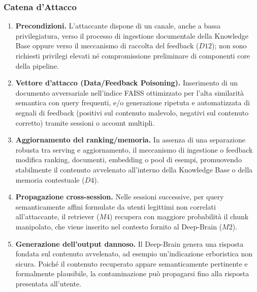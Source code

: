 \documentclass[11pt,a4paper]{article}
\begin{document}
\subsubsection{Catena d'Attacco}

\begin{enumerate}
    \item \textbf{Precondizioni.} L'attaccante dispone di un canale, anche a bassa privilegiatura,
    verso il processo di ingestione documentale della Knowledge Base oppure verso il meccanismo di
    raccolta del feedback ($D12$); non sono richiesti privilegi elevati né compromissione preliminare
    di componenti core della pipeline.

    \item \textbf{Vettore d'attacco (Data/Feedback Poisoning).} Inserimento di un documento
    avversariale nell'indice FAISS ottimizzato per l'alta similarità semantica con query frequenti,
    e/o generazione ripetuta e automatizzata di segnali di feedback (positivi sul contenuto malevolo,
    negativi sul contenuto corretto) tramite sessioni o account multipli.

    \item \textbf{Aggiornamento del ranking/memoria.} In assenza di una separazione robusta tra serving e aggiornamento,
    il meccanismo di ingestione o feedback modifica ranking, documenti,
    embedding o pool di esempi, promuovendo stabilmente il contenuto
    avvelenato all'interno della Knowledge Base o della memoria
    contestuale ($D4$).

    \item \textbf{Propagazione cross-session.} Nelle sessioni successive, per query semanticamente
    affini formulate da utenti legittimi non correlati all'attaccante, il retriever ($M4$) recupera
    con maggiore probabilità il chunk manipolato, che viene inserito nel contesto fornito al
    Deep-Brain ($M2$).

    \item \textbf{Generazione dell'output dannoso.} Il Deep-Brain genera una risposta fondata sul contenuto avvelenato,
    ad esempio un'indicazione erboristica non sicura. Poiché il contenuto
    recuperato appare semanticamente pertinente e formalmente plausibile,
    la contaminazione può propagarsi fino alla risposta presentata
    all'utente.
\end{enumerate}

\end{document}

